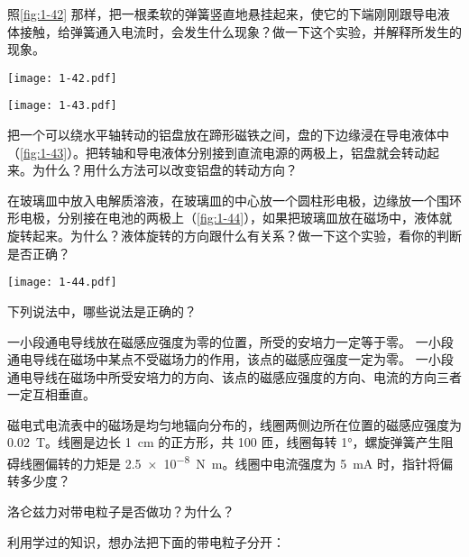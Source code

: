 \begin{Exercise}
\begin{question}
  \item 照\cref{fig:1-42} 那样，把一根柔软的弹簧竖直地悬挂起来，使它的下端刚刚跟导电液体接触，给弹簧通入电流时，会发生什么现象？做一下这个实验，并解释所发生的现象。
  \begin{figurehere}
    \begin{minipage}[b]{0.48\linewidth}\centering
      \texttt{[image: 1-42.pdf]}
      \caption{}\label{fig:1-42}
    \end{minipage}
    \begin{minipage}[b]{0.48\linewidth}\centering
      \texttt{[image: 1-43.pdf]}
      \caption{}\label{fig:1-43}
    \end{minipage}
  \end{figurehere}
  \item 把一个可以绕水平轴转动的铝盘放在蹄形磁铁之间，盘的下边缘浸在导电液体中（\cref{fig:1-43}）。把转轴和导电液体分别接到直流电源的两极上，铝盘就会转动起来。为什么？用什么方法可以改变铝盘的转动方向？
  \item 在玻璃皿中放入电解质溶液，在玻璃皿的中心放一个圆柱形电极，边缘放一个围环形电极，分别接在电池的两极上（\cref{fig:1-44}），如果把玻璃皿放在磁场中，液体就旋转起来。为什么？液体旋转的方向跟什么有关系？做一下这个实验，看你的判断是否正确？
  \begin{figurehere}
    \begin{minipage}{\linewidth}\centering
      \texttt{[image: 1-44.pdf]}
      \caption{}\label{fig:1-44}
    \end{minipage}
  \end{figurehere}
  \item 下列说法中，哪些说法是正确的？
  \begin{tasks}
    \task 一小段通电导线放在磁感应强度为零的位置，所受的安培力一定等于零。
    \task 一小段通电导线在磁场中某点不受磁场力的作用，该点的磁感应强度一定为零。
    \task 一小段通电导线在磁场中所受安培力的方向、该点的磁感应强度的方向、电流的方向三者一定互相垂直。
  \end{tasks}
  \item 磁电式电流表中的磁场是均匀地辐向分布的，线圈两侧边所在位置的磁感应强度为 \qty{0.02}{T}。线圈是边长 \qty{1}{cm} 的正方形，共 100 匝，线圈每转 \ang{1}，螺旋弹簧产生阻碍线圈偏转的力矩是 \qty{2.5e-8}{N.m}。线圈中电流强度为 \qty{5}{mA} 时，指针将偏转多少度？
  \item 洛仑兹力对带电粒子是否做功？为什么？    
  \item 利用学过的知识，想办法把下面的带电粒子分开：

\end{question}
\end{Exercise}
